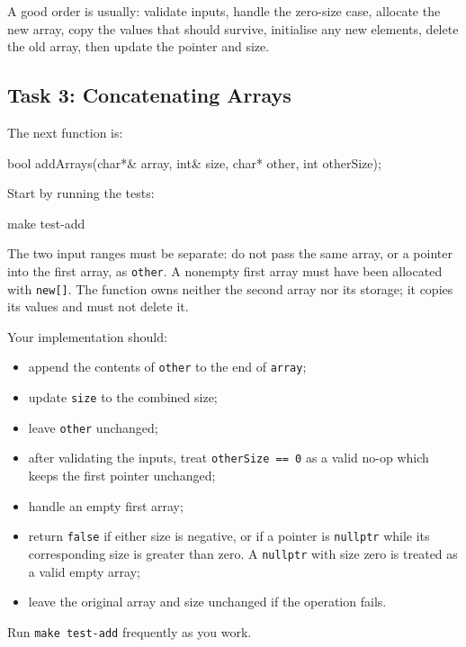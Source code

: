 \documentclass{csc2059practical}
\begin{document}
\begin{tipbox}
A good order is usually: validate inputs, handle the zero-size case, allocate the new array, copy the values that should survive, initialise any new elements, delete the old array, then update the pointer and size.
\end{tipbox}

\subsection{Task 3: Concatenating Arrays}

The next function is:

\begin{cppcode}
bool addArrays(char*& array,
               int& size,
               char* other,
               int otherSize);
\end{cppcode}

Start by running the tests:

\begin{bashcode}
make test-add
\end{bashcode}

The two input ranges must be separate: do not pass the same array, or a pointer into the first array, as \texttt{other}. A nonempty first array must have been allocated with \texttt{new[]}. The function owns neither the second array nor its storage; it copies its values and must not delete it.

Your implementation should:
\begin{itemize}
  \item append the contents of \texttt{other} to the end of \texttt{array};
  \item update \texttt{size} to the combined size;
  \item leave \texttt{other} unchanged;
  \item after validating the inputs, treat \texttt{otherSize == 0} as a valid no-op which keeps the first pointer unchanged;
  \item handle an empty first array;
  \item return \texttt{false} if either size is negative, or if a pointer is \texttt{nullptr} while its corresponding size is greater than zero. A \texttt{nullptr} with size zero is treated as a valid empty array;
  \item leave the original array and size unchanged if the operation fails.
\end{itemize}

Run \texttt{make test-add} frequently as you work.
\end{document}
